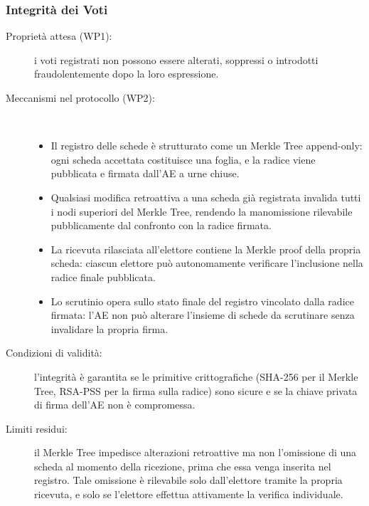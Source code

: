 \documentclass[12pt,a4paper]{article}
\begin{document}
\subsubsection{Integrità dei Voti}
\begin{description}
  \item[Proprietà attesa (WP1):] i voti registrati non possono essere alterati, soppressi o introdotti fraudolentemente dopo la loro espressione.
  \item[Meccanismi nel protocollo (WP2):] \
    \begin{itemize}
      \item Il registro delle schede è strutturato come un Merkle Tree append-only: ogni scheda accettata costituisce una foglia, e la radice viene pubblicata e firmata dall'AE a urne chiuse.
      \item Qualsiasi modifica retroattiva a una scheda già registrata invalida tutti i nodi superiori del Merkle Tree, rendendo la manomissione rilevabile pubblicamente dal confronto con la radice firmata.
      \item La ricevuta rilasciata all'elettore contiene la Merkle proof della propria scheda: ciascun elettore può autonomamente verificare l'inclusione nella radice finale pubblicata.
      \item Lo scrutinio opera sullo stato finale del registro vincolato dalla radice firmata: l'AE non può alterare l'insieme di schede da scrutinare senza invalidare la propria firma.
    \end{itemize}
  \item[Condizioni di validità:] l'integrità è garantita se le primitive crittografiche (SHA-256 per il Merkle Tree, RSA-PSS per la firma sulla radice) sono sicure e se la chiave privata di firma dell'AE non è compromessa.
  \item[Limiti residui:] il Merkle Tree impedisce alterazioni retroattive ma non l'omissione di una scheda al momento della ricezione, prima che essa venga inserita nel registro. Tale omissione è rilevabile solo dall'elettore tramite la propria ricevuta, e solo se l'elettore effettua attivamente la verifica individuale.
\end{description}
\end{document}
